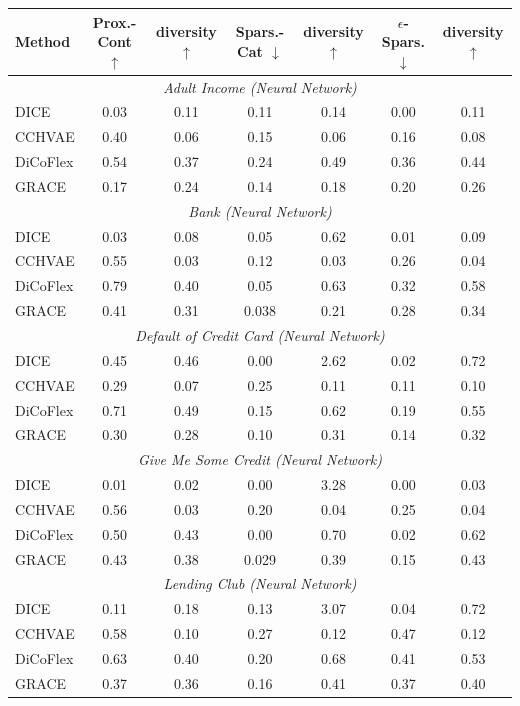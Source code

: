 \begin{table}[H]
\label{tab:protocol_B}
\centering
\setlength{\tabcolsep}{3pt}
\begin{tabular}{l cc|cc|cc}
\toprule
\textbf{Method} & \textbf{Prox.-Cont $\uparrow$} & \textbf{diversity $\uparrow$} & \textbf{Spars.-Cat $\downarrow$} & \textbf{diversity $\uparrow$} & \textbf{$\epsilon$-Spars. $\downarrow$} & \textbf{ diversity $\uparrow$}\\
\midrule
\multicolumn{7}{c}{\textit{Adult Income (Neural Network)}} \\
\midrule
DICE & 0.03 & 0.11 & 0.11 & 0.14 & 0.00 & 0.11\\
CCHVAE & 0.40 & 0.06 & 0.15 & 0.06 & 0.16 & 0.08\\
DiCoFlex & 0.54 & 0.37 & 0.24 & 0.49 & 0.36 & 0.44\\
GRACE & 0.17 & 0.24 & 0.14 & 0.18 & 0.20 & 0.26\\
\midrule
\multicolumn{7}{c}{\textit{Bank (Neural Network)}} \\
\midrule
DICE & 0.03 & 0.08 & 0.05 & 0.62 & 0.01 & 0.09\\
CCHVAE & 0.55 & 0.03 & 0.12 & 0.03 & 0.26 & 0.04\\
DiCoFlex & 0.79 & 0.40 & 0.05 & 0.63 & 0.32 & 0.58\\
GRACE & 0.41 & 0.31 & 0.038 & 0.21 & 0.28 & 0.34\\
\midrule
\multicolumn{7}{c}{\textit{Default of Credit Card (Neural Network)}} \\
\midrule
DICE & 0.45 & 0.46 & 0.00 & 2.62 & 0.02 & 0.72\\
CCHVAE & 0.29 & 0.07 & 0.25 & 0.11 & 0.11 & 0.10\\
DiCoFlex & 0.71 & 0.49 & 0.15 & 0.62 & 0.19 & 0.55\\
GRACE & 0.30 & 0.28 & 0.10 & 0.31 & 0.14 & 0.32\\
\midrule
\multicolumn{7}{c}{\textit{Give Me Some Credit (Neural Network)}} \\
\midrule
DICE & 0.01 & 0.02 & 0.00 & 3.28 & 0.00 & 0.03\\
CCHVAE & 0.56 & 0.03 & 0.20 & 0.04 & 0.25 & 0.04\\
DiCoFlex & 0.50 & 0.43 & 0.00 & 0.70 & 0.02 & 0.62\\
GRACE & 0.43 & 0.38 & 0.029 & 0.39 & 0.15 & 0.43\\
\midrule
\multicolumn{7}{c}{\textit{Lending Club (Neural Network)}} \\
\midrule
DICE & 0.11 & 0.18 & 0.13 & 3.07 & 0.04 & 0.72\\
CCHVAE & 0.58 & 0.10 & 0.27 & 0.12 & 0.47 & 0.12\\
DiCoFlex & 0.63 & 0.40 & 0.20 & 0.68 & 0.41 & 0.53\\
GRACE & 0.37 & 0.36 & 0.16 & 0.41 & 0.37 & 0.40\\
\bottomrule
\end{tabular}
\end{table}
